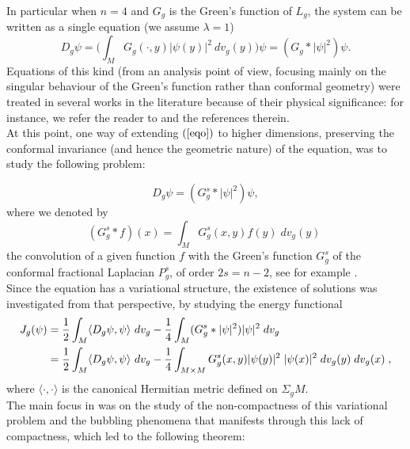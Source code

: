 \documentclass[11pt]{article}
\begin{document}
{\noindent
In particular when $n=4$ and $G_{g}$ is the Green's function of $L_{g}$, the system can be written as a single equation (we assume $\lambda=1$)
\begin{equation}\label{eqo}
D_{g}\psi=\Big(\int_{M}G_{g}(\cdot,y)|\psi(y)|^{2}\ dv_{g}(y)\Big) \psi = (G_g * |\psi|^{2})\psi.
\end{equation}
Equations of this kind (from an analysis point of view, focusing mainly on the singular behaviour of the Green's function rather than conformal geometry) were treated in several works in the literature because of their physical significance: for instance, we refer the reader to \cite{BGDB,DWX,ES,GG,Enno,Lieb1,Lieb2,MS} and the references therein.\\
At this point, one way of extending $(\ref{eqo})$ to higher dimensions, preserving the conformal invariance (and hence the geometric nature) of the equation, was to study the following problem:

\begin{equation}\label{eq}
D_g\psi=(G_g^{s}*|\psi|^{2})\psi,
\end{equation}
where we denoted by $$(G_g^{s}*f)(x) =\int_{M}G_g^{s}(x,y)f(y) \; dv_{g}(y) \; $$
the convolution of a given function $f$ with the Green's function $G_g^{s}$ of the conformal fractional Laplacian  $P_{g}^{s}$, of order $2s=n-2$, see for example \cite{CC, Mar, GJMS, GZ}.\\
Since the equation has a variational structure, the existence of solutions was investigated from that perspective, by studying the energy functional
\begin{align}\label{energyfunctional}
J_{g}(\psi) & = \frac{1}{2}\int_{M}\langle D_g\psi,\psi\rangle \ dv_{g}-\frac{1}{4}\int_{M} (G_g^{s}*|\psi|^{2})|\psi|^{2}\; dv_{g} \notag \\
& = \frac{1}{2}\int_{M}\langle D_g\psi,\psi\rangle \ dv_{g}-\frac{1}{4}\int_{M\times M} G_g^{s}(x,y)|\psi(y)|^{2} \; |\psi(x)|^{2}\; dv_{g}(y)\; dv_{g}(x) \;,
\end{align}
where $\langle \cdot ,\cdot\rangle$ is the canonical Hermitian metric defined on  $\Sigma_g M$.\\
The main focus in \cite{MMM} was on the study of the non-compactness of this variational problem and the bubbling phenomena that manifests through this lack of compactness, which led to the following theorem:


}
\end{document}

